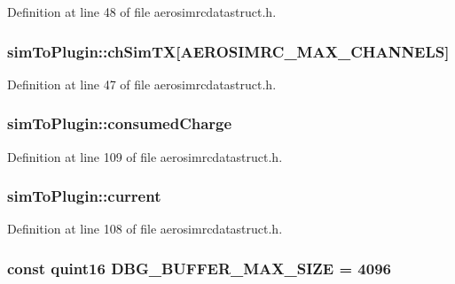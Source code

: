 Definition at line 48 of file aerosimrcdatastruct.\-h.

\hypertarget{group___aero_sim_r_c_gae5ff2433affe60bce670d0c6bf66ee06}{
\subsubsection[{ch\-Sim\-T\-X}]{ sim\-To\-Plugin\-::ch\-Sim\-T\-X\mbox{[}{\bf A\-E\-R\-O\-S\-I\-M\-R\-C\-\_\-\-M\-A\-X\-\_\-\-C\-H\-A\-N\-N\-E\-L\-S}\mbox{]}}}\label{group___aero_sim_r_c_gae5ff2433affe60bce670d0c6bf66ee06}


Definition at line 47 of file aerosimrcdatastruct.\-h.

\hypertarget{group___aero_sim_r_c_ga408ab8a806126f8c39a224202f7784c9}{
\subsubsection[{consumed\-Charge}]{ sim\-To\-Plugin\-::consumed\-Charge}}\label{group___aero_sim_r_c_ga408ab8a806126f8c39a224202f7784c9}


Definition at line 109 of file aerosimrcdatastruct.\-h.

\hypertarget{group___aero_sim_r_c_ga67b8bd84d98afe25c5300ecaa1e3b1ac}{
\subsubsection[{current}]{ sim\-To\-Plugin\-::current}}\label{group___aero_sim_r_c_ga67b8bd84d98afe25c5300ecaa1e3b1ac}


Definition at line 108 of file aerosimrcdatastruct.\-h.

\hypertarget{group___aero_sim_r_c_ga4ac56108ad3d382deff679f792d02874}{
\subsubsection[{D\-B\-G\-\_\-\-B\-U\-F\-F\-E\-R\-\_\-\-M\-A\-X\-\_\-\-S\-I\-Z\-E}]{\setlength{\rightskip}{0pt plus 5cm}const quint16 D\-B\-G\-\_\-\-B\-U\-F\-F\-E\-R\-\_\-\-M\-A\-X\-\_\-\-S\-I\-Z\-E = 4096}}\label{group___aero_sim_r_c_ga4ac56108ad3d382deff679f792d02874}


